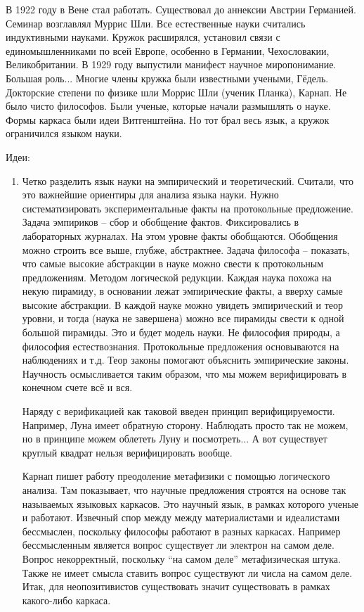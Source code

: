 \documentclass[a4paper, 12pt]{article}
\begin{document}
В 1922 году в Вене стал работать. Существовал до аннексии Австрии 
Германией. Семинар возглавлял Муррис Шли. Все естественные науки 
считались индуктивными науками. Кружок расширялся, установил связи 
с единомышленниками по всей Европе, особенно в Германии, Чехословакии, 
Великобритании. В 1929 году выпустили манифест научное миропонимание. 
Большая роль... Многие члены кружка были известными учеными, Гёдель. 
Докторские степени по физике шли Моррис Шли (ученик Планка), Карнап. Не 
было чисто философов. Были ученые, которые начали размышлять о науке. 
Формы каркаса были идеи Витгенштейна. Но тот брал весь язык, а кружок 
ограничился языком науки.

Идеи:
\begin{enumerate}
  \item Четко разделить язык науки на эмпирический и теоретический. 
    Считали, что это важнейшие ориентиры для анализа языка науки. Нужно 
    систематизировать экспериментальные факты на протокольные 
    предложение. Задача эмпириков -- сбор и обобщение фактов. 
    Фиксировались в лабораторных журналах. На этом уровне факты 
    обобщаются. Обобщения можно строить все выше, глубже, абстрактнее. 
    Задача философа -- показать, что самые высокие абстракции в науке 
    можно свести к протокольным предложениям. Методом логической 
    редукции. Каждая наука похожа на некую пирамиду, в основании лежат 
    эмпирические факты, а вверху самые высокие абстракции. В каждой 
    науке можно увидеть эмпирический и теор уровни, и тогда (наука не 
    завершена) можно все пирамиды свести к одной большой пирамиды. Это 
    и будет модель науки. Не философия природы, а философия 
    естествознания. Протокольные предложения основываются на наблюдениях 
    и т.д. Теор законы помогают объяснить эмпирические законы. Научность 
    осмысливается таким образом, что мы можем верифицировать в конечном 
    счете всё и вся.

    Наряду с верификацией как таковой введен принцип верифицируемости. 
    Например, Луна имеет обратную сторону. Наблюдать просто так не 
    можем, но в принципе можем облететь Луну и посмотреть... А вот 
    существует круглый квадрат нельзя верифицировать вообще.

    Карнап пишет работу преодоление метафизики с помощью логического 
    анализа. Там показывает, что научные предложения строятся на основе 
    так называемых языковых каркасов. Это научный язык, в рамках 
    которого ученые и работают. Извечный спор между между материалистами 
    и идеалистами бессмыслен, поскольку философы работают в разных 
    каркасах. Например бессмысленным является вопрос существует ли 
    электрон на самом деле. Вопрос некорректный, поскольку ``на самом 
    деле'' метафизическая штука. Также не имеет смысла ставить вопрос 
    существуют ли числа на самом деле. Итак, для неопозитивистов 
    существовать значит существовать в рамках какого-либо каркаса.


\end{enumerate}
\end{document}
